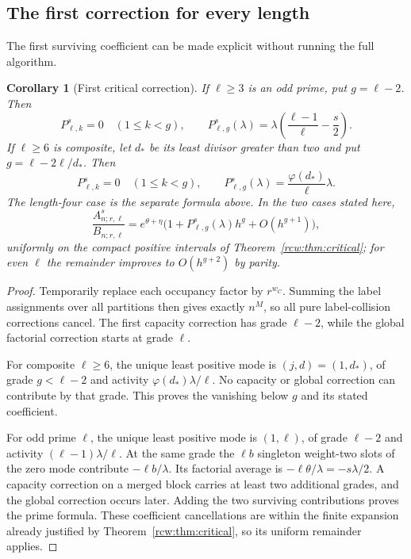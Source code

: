 \documentclass[11pt]{article}
\newtheorem{corollary}[theorem]{Corollary}
\theoremstyle{definition}\newtheorem{definition}[theorem]{Definition}
\theoremstyle{remark}\newtheorem{remark}[theorem]{Remark}
\newcommand{\A}{A^s_{n;r,\ell}}
\newcommand{\B}{B_{n;r,\ell}}
\numberwithin{equation}{section}
\begin{document}
\subsection{The first correction for every length}
The first surviving coefficient can be made explicit without running the full algorithm.
\begin{corollary}[First critical correction]\label{rcw:cor:firstlength}
If $\ell\ge3$ is an odd prime, put $g=\ell-2$. Then
\[
 P^s_{\ell,k}=0\quad(1\le k<g),\qquad
 P^s_{\ell,g}(\lambda)
   =\lambda\left(\frac{\ell-1}{\ell}-\frac s2\right).
\]
If $\ell\ge6$ is composite, let $d_*$ be its least divisor greater than two and put $g=\ell-2\ell/d_*$. Then
\[
 P^s_{\ell,k}=0\quad(1\le k<g),\qquad
 P^s_{\ell,g}(\lambda)=\frac{\varphi(d_*)}{\ell}\lambda.
\]
The length-four case is the separate formula above. In the two cases stated here,
\[
 \frac{\A}{\B}=e^{\theta+\eta}
    \bigl(1+P^s_{\ell,g}(\lambda)h^g+O(h^{g+1})\bigr),
\]
uniformly on the compact positive intervals of Theorem~\ref{rcw:thm:critical}; for even $\ell$ the remainder improves to $O(h^{g+2})$ by parity.
\end{corollary}
\begin{proof}
Temporarily replace each occupancy factor by $r^{w_C}$. Summing the label assignments over all partitions then gives exactly $n^M$, so all pure label-collision corrections cancel. The first capacity correction has grade $\ell-2$, while the global factorial correction starts at grade $\ell$.

For composite $\ell\ge6$, the unique least positive mode is $(j,d)=(1,d_*)$, of grade $g<\ell-2$ and activity $\varphi(d_*)\lambda/\ell$. No capacity or global correction can contribute by that grade. This proves the vanishing below $g$ and its stated coefficient.

For odd prime $\ell$, the unique least positive mode is $(1,\ell)$, of grade $\ell-2$ and activity $(\ell-1)\lambda/\ell$. At the same grade the $\ell b$ singleton weight-two slots of the zero mode contribute $-\ell b/\lambda$. Its factorial average is $-\ell\theta/\lambda=-s\lambda/2$. A capacity correction on a merged block carries at least two additional grades, and the global correction occurs later. Adding the two surviving contributions proves the prime formula. These coefficient cancellations are within the finite expansion already justified by Theorem~\ref{rcw:thm:critical}, so its uniform remainder applies.
\end{proof}
\end{document}
